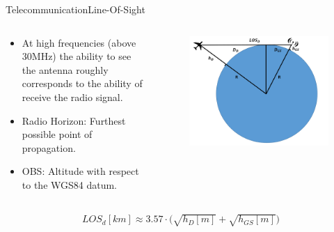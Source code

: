 

\begin{frame}{Telecommunication}{Line-Of-Sight}
  \begin{columns}[T]
    \begin{column}{.5\textwidth}
      \begin{block}{}
        \begin{itemize}
          \item {At high frequencies (above 30MHz) the ability to see the antenna roughly corresponds to the ability of receive the radio signal.}
          \item {Radio Horizon: Furthest possible point of propagation.}
          \item {OBS: Altitude with respect to the WGS84 datum.}
        \end{itemize}
      \end{block}
    \end{column}
    \begin{column}{.5\textwidth}
      \begin{figure}
        \includegraphics[scale=0.25]{figures/LOS.png}
      \end{figure}
    \end{column}
  \end{columns}

    \begin{align*}      
        LOS_d[km]  \approx {3.57\cdot (\sqrt{h_D[m]} + \sqrt{h_{GS}[m]}} )
    \end{align*}

\end{frame}


